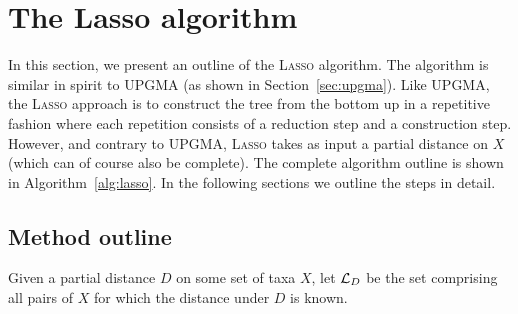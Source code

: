 
\section{The {\sc Lasso} algorithm}
\label{sec:sc-lasso-algorithm}

In this section, we present an outline of the \textsc{Lasso} algorithm.  The
algorithm is similar in spirit to \textsc{UPGMA} (as shown in
Section~\ref{sec:upgma}).  Like \textsc{UPGMA}, the \textsc{Lasso} approach is to
construct the tree from the bottom up in a repetitive fashion where each
repetition consists of a reduction step and a construction step.  However, and
contrary to {\sc UPGMA}, \textsc{Lasso} takes as input a partial distance on
$X$ (which can of course also be complete).  The complete algorithm outline is
shown in Algorithm~\ref{alg:lasso}.  In the following sections we outline the
steps in detail.

\subsection{Method outline}
\label{sec:method-outline}

Given a partial distance $D$ on some set of taxa $X$, let ${\mathcal L}_D$ be the set
comprising all pairs of $X$ for which the distance under $D$ is known.

